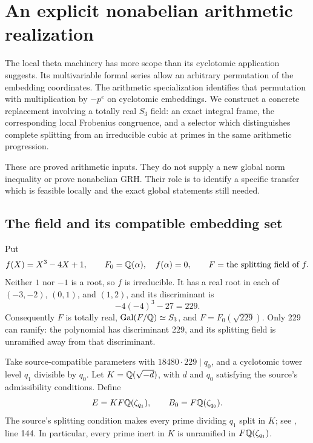 \section{An explicit nonabelian arithmetic realization}
\label{sec:nonabelian-frame}

The local theta machinery has more scope than its cyclotomic application
suggests. Its multivariable formal series allow an arbitrary permutation
of the embedding coordinates. The arithmetic specialization identifies
that permutation with multiplication by $-p^e$ on cyclotomic embeddings.
We construct a concrete replacement involving a totally real $S_3$
field: an exact integral frame, the corresponding local Frobenius
congruence, and a selector which distinguishes complete splitting from
an irreducible cubic at primes in the same arithmetic progression.

These are proved arithmetic inputs. They do not supply a new global
norm inequality or prove nonabelian GRH. Their role is to identify a
specific transfer which is feasible locally and the exact global
statements still needed.

\subsection{The field and its compatible embedding set}

Put
\[
 f(X)=X^3-4X+1,\qquad F_0=\mathbb Q(\alpha),\quad f(\alpha)=0,
 \qquad F=\text{the splitting field of }f.
\]
Neither $1$ nor $-1$ is a root, so $f$ is irreducible. It has a real
root in each of $(-3,-2)$, $(0,1)$, and $(1,2)$, and its discriminant is
\[
 -4(-4)^3-27=229.
\]
Consequently $F$ is totally real,
$\operatorname{Gal}(F/\mathbb Q)\simeq S_3$, and $F=F_0(\sqrt{229})$.
Only 229 can ramify: the polynomial has discriminant 229, and its
splitting field is unramified away from that discriminant.

Take source-compatible parameters with
$18480\cdot229\mid q_0$, and a cyclotomic tower level $q_1$ divisible
by $q_0$. Let $K=\mathbb Q(\sqrt{-d})$, with $d$ and $q_0$ satisfying the
source's admissibility conditions. Define
\[
 E=KF\mathbb Q(\zeta_{q_1}),\qquad B_0=F\mathbb Q(\zeta_{q_0}).
\]
The source's splitting condition makes every prime dividing $q_1$
split in $K$; see
,
line 144. In particular, every prime inert in $K$ is unramified in
$F\mathbb Q(\zeta_{q_1})$.

